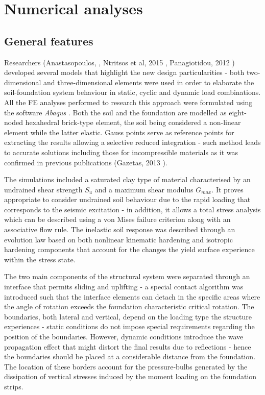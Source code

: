\documentclass[12pt,a4paper]{report}
\begin{document}
\section{Numerical analyses}
\subsection{General features}
Researchers (Anastasopoulos, \cite{anastasopoulos2014simplified}, Ntritsos et al, 2015 \cite{ntritsos2015static}, Panagiotidou, 2012 \cite{panagiotidou2012pushover}) developed several models that highlight the new design particularities - both two-dimensional and three-dimensional elements were used in order to elaborate the soil-foundation system behaviour in static, cyclic and dynamic load combinations. All the FE analyses performed to research this approach were formulated using the software \textit{Abaqus} \cite{manualversion}. Both the soil and the foundation are modelled as eight-noded hexahedral brick-type element, the soil being considered a non-linear element while the latter elastic. Gauss points serve as reference points for extracting the results allowing a selective reduced integration - such method leads to accurate solutions including those for incompressible materials as it was confirmed in previous publications (Gazetas, 2013 \cite{gazetas2013nonlinear}).

The simulations included a saturated clay type of material characterised by an undrained shear strength $S_u$ and a maximum shear modulus $G_{max}$. It proves appropriate to consider undrained soil behaviour due to the rapid loading that corresponds to the seismic excitation - in addition, it allows a total stress analysis which can be described using a von Mises failure criterion along with an associative flow rule. The inelastic soil response was described through an evolution law based on both nonlinear kinematic hardening and isotropic hardening components that account for the changes the yield surface experience within the stress state.

The two main components of the structural system were separated through an interface that permits sliding and uplifting - a special contact algorithm was introduced such that the interface elements can detach in the specific areas where the angle of rotation exceeds the foundation characteristic critical rotation. The boundaries, both lateral and vertical, depend on the loading type the structure experiences - static conditions do not impose special requirements regarding the position of the boundaries. However, dynamic conditions introduce the wave propagation effect that might distort the final results due to reflections - hence the boundaries should be placed at a considerable distance from the foundation. The location of these borders account for the pressure-bulbs generated by the dissipation of vertical stresses induced by the moment loading on the foundation strips.
\end{document}

